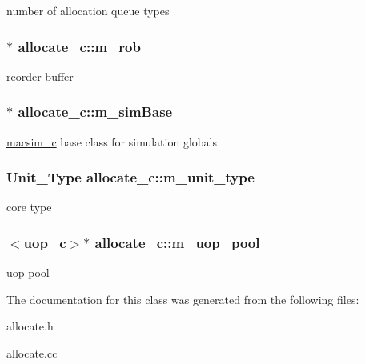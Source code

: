 \label{classallocate__c_adae0a88e65e155bda9ab14a7d5e31407}
number of allocation queue types \hypertarget{classallocate__c_a0fee2d1b2259dc490cc23073818392e6}{
\subsubsection[{m\_\-rob}]{$\ast$ {\bf allocate\_\-c::m\_\-rob}}}
\label{classallocate__c_a0fee2d1b2259dc490cc23073818392e6}
reorder buffer \hypertarget{classallocate__c_ab503a0bd98d849f9904c62951f1574f2}{
\subsubsection[{m\_\-simBase}]{$\ast$ {\bf allocate\_\-c::m\_\-simBase}}}
\label{classallocate__c_ab503a0bd98d849f9904c62951f1574f2}
\hyperlink{classmacsim__c}{macsim\_\-c} base class for simulation globals \hypertarget{classallocate__c_a12688d33e58ab73cac49bb5cb01b9dbb}{
\subsubsection[{m\_\-unit\_\-type}]{\setlength{\rightskip}{0pt plus 5cm}Unit\_\-Type {\bf allocate\_\-c::m\_\-unit\_\-type}}}
\label{classallocate__c_a12688d33e58ab73cac49bb5cb01b9dbb}
core type \hypertarget{classallocate__c_ae224c68abb9e44d0e49c9733bc40a3c4}{
\subsubsection[{m\_\-uop\_\-pool}]{$<${\bf uop\_\-c}$>$$\ast$ {\bf allocate\_\-c::m\_\-uop\_\-pool}}}
\label{classallocate__c_ae224c68abb9e44d0e49c9733bc40a3c4}
uop pool 

The documentation for this class was generated from the following files:\begin{DoxyCompactItemize}
\item 
allocate.h\item 
allocate.cc\end{DoxyCompactItemize}
